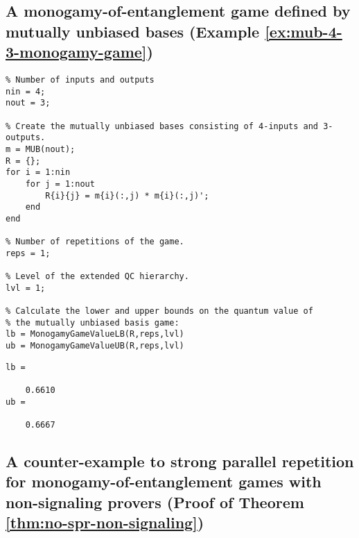\subsection{A monogamy-of-entanglement game defined by mutually unbiased bases (Example \ref{ex:mub-4-3-monogamy-game})} \label{code:mub-4-3}

\begin{verbatim}
% Number of inputs and outputs
nin = 4;
nout = 3;

% Create the mutually unbiased bases consisting of 4-inputs and 3-outputs.
m = MUB(nout); 
R = {};
for i = 1:nin
    for j = 1:nout
        R{i}{j} = m{i}(:,j) * m{i}(:,j)';
    end
end

% Number of repetitions of the game. 
reps = 1; 

% Level of the extended QC hierarchy.
lvl = 1;

% Calculate the lower and upper bounds on the quantum value of
% the mutually unbiased basis game:
lb = MonogamyGameValueLB(R,reps,lvl)
ub = MonogamyGameValueUB(R,reps,lvl)
\end{verbatim}
\color{lightgray} 
\begin{verbatim}     
lb =

    0.6610
ub =

    0.6667
\end{verbatim}
\color{black}

\subsection{A counter-example to strong parallel repetition for monogamy-of-entanglement games with non-signaling provers (Proof of Theorem \ref{thm:no-spr-non-signaling})} \label{code:ns-counter-example-monogamy-game}

